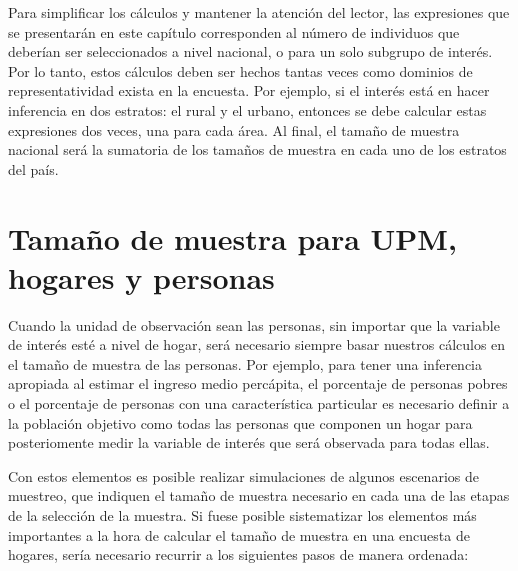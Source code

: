 \documentclass[
  12pt,
]{book}
\begin{document}
Para simplificar los cálculos y mantener la atención del lector, las expresiones que se presentarán en este capítulo corresponden al número de individuos que deberían ser seleccionados a nivel nacional, o para un solo subgrupo de interés. Por lo tanto, estos cálculos deben ser hechos tantas veces como dominios de representatividad exista en la encuesta. Por ejemplo, si el interés está en hacer inferencia en dos estratos: el rural y el urbano, entonces se debe calcular estas expresiones dos veces, una para cada área. Al final, el tamaño de muestra nacional será la sumatoria de los tamaños de muestra en cada uno de los estratos del país.

\hypertarget{tamauxf1o-de-muestra-para-upm-hogares-y-personas}{%
\section{Tamaño de muestra para UPM, hogares y personas}\label{tamauxf1o-de-muestra-para-upm-hogares-y-personas}}

Cuando la unidad de observación sean las personas, sin importar que la variable de interés esté a nivel de hogar, será necesario siempre basar nuestros cálculos en el tamaño de muestra de las personas. Por ejemplo, para tener una inferencia apropiada al estimar el ingreso medio percápita, el porcentaje de personas pobres o el porcentaje de personas con una característica particular es necesario definir a la población objetivo como todas las personas que componen un hogar para posteriomente medir la variable de interés que será observada para todas ellas.

Con estos elementos es posible realizar simulaciones de algunos escenarios de muestreo, que indiquen el tamaño de muestra necesario en cada una de las etapas de la selección de la muestra. Si fuese posible sistematizar los elementos más importantes a la hora de calcular el tamaño de muestra en una encuesta de hogares, sería necesario recurrir a los siguientes pasos de manera ordenada:
\end{document}

